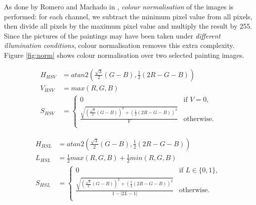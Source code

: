 \documentclass[11pt,a4paper,twoside,openright]{report}
\begin{document}
As done by Romero and Machado in \cite{jma12clas}, \emph{colour normalisation}
of the images is performed: for each channel, we subtract the minimum pixel
value from all pixels, then divide all pixels by the maximum pixel value and
multiply the result by 255.  Since the pictures of the paintings may have been
taken under \emph{different illumination conditions}, colour normalisation
removes this extra complexity.  Figure \ref{fig:norm} shows colour
normalisation over two selected painting images.

\begin{figure}[thb]
\begin{equation}
\begin{aligned}
H_{HSV}  &= atan2\left(\frac{\sqrt{3}}{2}(G-B), \frac{1}{2}(2R-G-B)\right) \\
V_{HSV}  &= max(R,G,B) \\
S_{HSV}  &= \left\{
  \begin{array}{ll}
    0  &  \text{if } V = 0, \\
    \frac{\sqrt{ \left(\frac{\sqrt{3}}{2}(G-B)\right)^2
               + \left(\frac{1}{2}(2R-G-B)\right)^2 }}{V}
  &  \text{otherwise}. \\
  \end{array}
            \right.
\label{eq:hsv}
\end{aligned}
\end{equation}
\end{figure}

\begin{figure}[thb]
\begin{equation}
\begin{aligned}
H_{HSL}  &= atan2\left(\frac{\sqrt{3}}{2}(G-B), \frac{1}{2}(2R-G-B)\right) \\
L_{HSL}  &= \frac{1}{2}max(R,G,B) + \frac{1}{2}min(R,G,B) \\
S_{HSL}  &= \left\{
  \begin{array}{ll}
    0  &  \text{if } L \in \{0,1\}, \\
    \frac{\sqrt{ \left(\frac{\sqrt{3}}{2}(G-B)\right)^2
               + \left(\frac{1}{2}(2R-G-B)\right)^2 }}{1 - \lvert 2L-1 \rvert}
  &  \text{otherwise}. \\
  \end{array}
           \right.
\label{eq:hsl}
\end{aligned}
\end{equation}
\end{figure}
\end{document}
